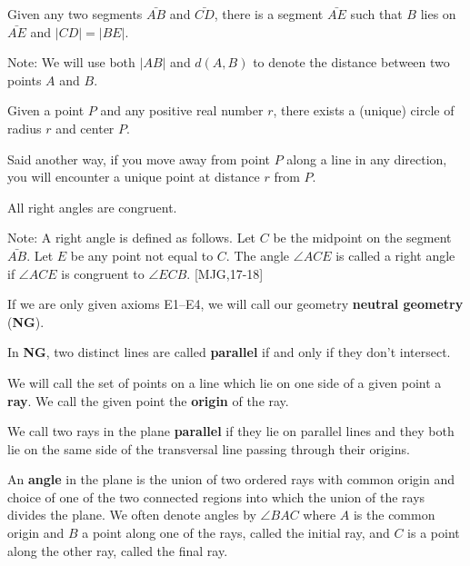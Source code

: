 \documentclass{ximera}
\begin{document}
\begin{axiom}[E2] 
Given any two segments $\bar{AB}$ and $\bar{CD}$, there is a
segment $\bar{AE}$ such that $B$ lies on $\bar{AE}$ and
$\left\vert CD\right\vert =\left\vert BE\right\vert$.

Note: We will use both $\left\vert AB\right\vert$ and $d(A,B)$ to
denote the distance between two points $A$ and $B$.
\end{axiom}

\begin{axiom}[E3]
Given a point $P$ and any positive real number $r$, there exists a
(unique) circle of radius $r$ and center $P$. 

Said another way, if you move away from point $P$ along a line in any
direction, you will encounter a unique point at distance $r$ from $P$.
\end{axiom}

\begin{axiom}[E4]
All right angles are congruent.

Note: A right angle is defined as follows. Let $C$ be the midpoint on
the segment $\bar{AB}$. Let $E$ be any point not equal to
$C$. The angle $\angle ACE$ is called a right angle if $\angle ACE$ is
congruent to $\angle ECB$. [MJG,17-18]
\end{axiom}

\begin{definition}
If we are only given axioms E1--E4, we will call our
geometry \textbf{neutral geometry} (\textbf{NG}).
\end{definition}

\begin{definition}
In \textbf{NG}, two distinct lines are called \textbf{parallel} if and
only if they don't intersect.
\end{definition}



\begin{definition} 
We will call the set of points on a line which lie on one side of a
given point a \textbf{ray}.  We call the given point the
\textbf{origin} of the ray.
\end{definition}

\begin{definition}
We call two rays in the plane \textbf{parallel} if they lie on
parallel lines and they both lie on the same side of the transversal
line passing through their origins.
\end{definition}

\begin{definition} An \textbf{angle} in the plane is the union of two ordered
rays with common origin and choice of one of the two connected regions
into which the union of the rays divides the plane. We often denote
angles by $\angle BAC$ where $A$ is the common origin and $B$ a point
along one of the rays, called the initial ray, and $C$ is a point
along the other ray, called the final ray.
\end{definition}
\end{document}
